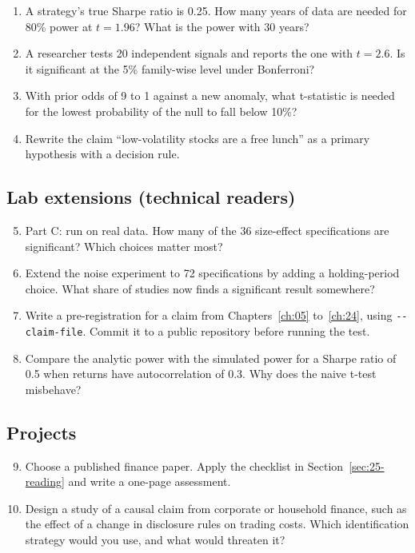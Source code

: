 \begin{enumerate}
  \item A strategy's true Sharpe ratio is 0.25. How many years of data are needed for 80\% power at $t = 1.96$? What is the power with 30 years?
  \item A researcher tests 20 independent signals and reports the one with $t = 2.6$. Is it significant at the 5\% family-wise level under Bonferroni?
  \item With prior odds of 9 to 1 against a new anomaly, what t-statistic is needed for the lowest probability of the null to fall below 10\%?
  \item Rewrite the claim ``low-volatility stocks are a free lunch'' as a primary hypothesis with a decision rule.
\end{enumerate}

\subsection*{Lab extensions (technical readers)}

\begin{enumerate}
  \setcounter{enumi}{4}
  \item Part C: run on real data. How many of the 36 size-effect specifications are significant? Which choices matter most?
  \item Extend the noise experiment to 72 specifications by adding a holding-period choice. What share of studies now finds a significant result somewhere?
  \item {\sloppy Write a pre-registration for a claim from Chapters~\ref{ch:05} to~\ref{ch:24}, using \texttt{-{}-claim-file}. Commit it to a public repository before running the test.\par}
  \item Compare the analytic power with the simulated power for a Sharpe ratio of 0.5 when returns have autocorrelation of 0.3. Why does the naive t-test misbehave?
\end{enumerate}

\subsection*{Projects}

\begin{enumerate}
  \setcounter{enumi}{8}
  \item Choose a published finance paper. Apply the checklist in Section~\ref{sec:25-reading} and write a one-page assessment.
  \item Design a study of a causal claim from corporate or household finance, such as the effect of a change in disclosure rules on trading costs. Which identification strategy would you use, and what would threaten it?
\end{enumerate}
